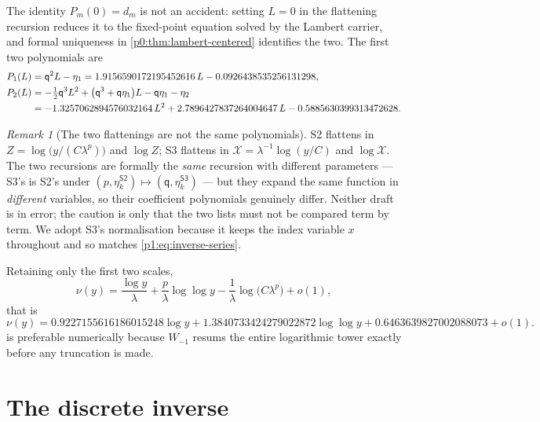 \documentclass[11pt,a4paper,oneside]{book}
\theoremstyle{plain}
\theoremstyle{definition}
\theoremstyle{remark}
\newtheorem{remark}[theorem]{Remark}
\newcommand{\littleo}{o}
\newcommand{\Wlam}{W}
\begin{document}
The identity $P_m(0)=d_m$ is not an accident: setting $L=0$ in the flattening recursion
reduces it to the fixed-point equation solved by the Lambert carrier, and formal uniqueness in
\cref{p0:thm:lambert-centered} identifies the two.  The first two polynomials are
\begin{align}
 P_1(L)&=\mathsf q^{2}L-\eta_1
 =1.9156590172195452616\,L-0.0926438535256131298,
 \label{p1:eq:P1}\\
 P_2(L)&=-\tfrac12\mathsf q^{3}L^{2}
 +\bigl(\mathsf q^{3}+\mathsf q\eta_1\bigr)L
 -\mathsf q\eta_1-\eta_2\notag\\
 &=-1.3257062894576032164\,L^{2}
 +2.7896427837264004647\,L
 -0.5885630399313472628 .
 \label{p1:eq:P2}
\end{align}

\begin{remark}[The two flattenings are not the same polynomials]
\label{p1:rem:two-flattenings}
\textsf{S2} flattens in $Z=\log\bigl(y/(C\lambda^{p})\bigr)$ and $\log Z$; \textsf{S3}
flattens in $\mathcal X=\lambda^{-1}\log(y/C)$ and $\log\mathcal X$. The two recursions are
formally the \emph{same} recursion with different parameters --- \textsf{S3}'s is
\textsf{S2}'s under $(p,\eta^{\textsf{S2}}_k)\mapsto(\mathsf q,\eta^{\textsf{S3}}_k)$ --- but
they expand the same function in \emph{different} variables, so their coefficient polynomials
genuinely differ.  Neither draft is in error; the caution is only that the two lists must not
be compared term by term.  We adopt \textsf{S3}'s normalisation because it keeps the index
variable $x$ throughout and so matches \cref{p1:eq:inverse-series}.
\end{remark}

Retaining only the first two scales,
\begin{equation}
 \nu(y)=\frac{\log y}{\lambda}+\frac p\lambda\log\log y
 -\frac1\lambda\log\bigl(C\lambda^{p}\bigr)+\littleo(1),
 \label{p1:eq:inverse-elementary}
\end{equation}
that is
\begin{equation}
 \nu(y)=0.9227155616186015248\log y
 +1.3840733424279022872\log\log y
 +0.6463639827002088073+\littleo(1).
 \label{p1:eq:inverse-elementary-numeric}
\end{equation}
 is preferable numerically because $\Wlam_{-1}$ resums the entire
logarithmic tower exactly before any truncation is made.

\section{The discrete inverse}
\label{p1:sec:discrete}
\end{document}
